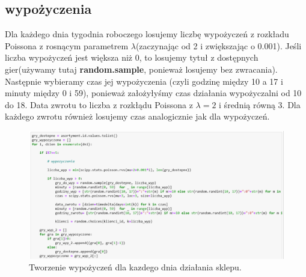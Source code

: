 \documentclass[12pt, letterpaper]{article}
\begin{document}
\subsection{wypożyczenia}

Dla każdego dnia tygodnia roboczego losujemy liczbę wypożyczeń z rozkładu Poissona z rosnącym parametrem $\lambda$(zaczynając od 2 i zwiększając o 0.001). Jeśli liczba wypożyczeń jest większa niż 0, to losujemy tytuł z dostępnych gier(używamy tutaj \textbf{random.sample}, ponieważ losujemy bez zwracania). Następnie wybieramy czas jej wypożyczenia (czyli godzinę między 10 a 17 i minuty między 0 i 59), ponieważ założyłyśmy czas działania wypożyczalni od 10 do 18.
Data zwrotu to liczba z rozkłądu Poissona z $\lambda = 2$ i średnią równą 3. Dla każdego zwrotu również losujemy czas analogicznie jak dla wypożyczeń. 
\begin{figure}[h!]
	\centering
	\includegraphics[width=1.0\textwidth]{7.png}
	\caption{Tworzenie wypożyczeń dla kazdego dnia działania sklepu.}
\end{figure}



	
\end{document}
